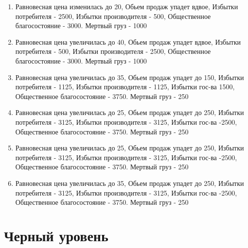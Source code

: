 \documentclass[a4paper,12pt]{article}
\begin{document}
\begin{enumerate}
    \item Равновесная цена изменилась до 20, Обьем продаж упадет вдвое, Избытки потребителя - 2500, Избытки производителя - 500, Общественное благосостояние - 3000. Мертвый груз - 1000
    \item Равновесная цена увеличилась до 40, Обьем продаж упадет вдвое, Избытки потребителя - 500, Избытки производителя - 2500, Общественное благосостояние - 3000. Мертвый груз - 1000
    \item Равновесная цена увеличилась до 35, Обьем продаж упадет до 150, Избытки потребителя - 1125, Избытки производителя - 1125, Избытки гос-ва 1500, Общественное благосостояние - 3750. Мертвый груз - 250
    \item Равновесная цена увеличилась до 25, Обьем продаж упадет до 250, Избытки потребителя - 3125, Избытки производителя - 3125, Избытки гос-ва -2500, Общественное благосостояние - 3750. Мертвый груз - 250
    \item Равновесная цена увеличилась до 25, Обьем продаж упадет до 250, Избытки потребителя - 3125, Избытки производителя - 3125, Избытки гос-ва -2500, Общественное благосостояние - 3750. Мертвый груз - 250
    \item Равновесная цена увеличилась до 35, Обьем продаж упадет до 250, Избытки потребителя - 3125, Избытки производителя - 3125, Избытки гос-ва -2500, Общественное благосостояние - 3750. Мертвый груз - 250
\end{enumerate}

\section{Черный уровень}
\end{document}
